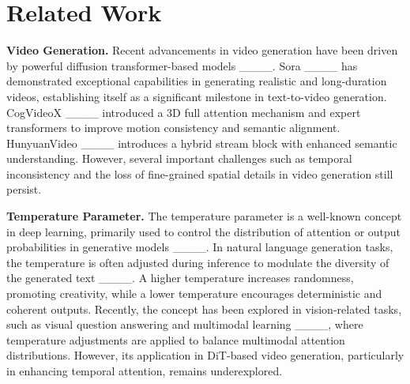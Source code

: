 \section{Related Work}
\textbf{Video Generation.} Recent advancements in video generation have been driven by powerful diffusion transformer-based models ____. Sora ____ has demonstrated exceptional capabilities in generating realistic and long-duration videos, establishing itself as a significant milestone in text-to-video generation. CogVideoX ____ introduced a 3D full attention mechanism and expert transformers to improve motion consistency and semantic alignment. HunyuanVideo ____ introduces a hybrid stream block with enhanced semantic understanding. 
However, several important challenges such as temporal inconsistency and the loss of fine-grained spatial details in video generation still persist.

\textbf{Temperature Parameter.} The temperature parameter is a well-known concept in deep learning, primarily used to control the distribution of attention or output probabilities in generative models ____. In natural language generation tasks, the temperature is often adjusted during inference to modulate the diversity of the generated text ____. 
A higher temperature increases randomness, promoting creativity, while a lower temperature encourages deterministic and coherent outputs. 
Recently, the concept has been explored in vision-related tasks, such as visual question answering and multimodal learning ____, where temperature adjustments are applied to balance multimodal attention distributions. However, its application in DiT-based video generation, particularly in enhancing temporal attention, remains underexplored.